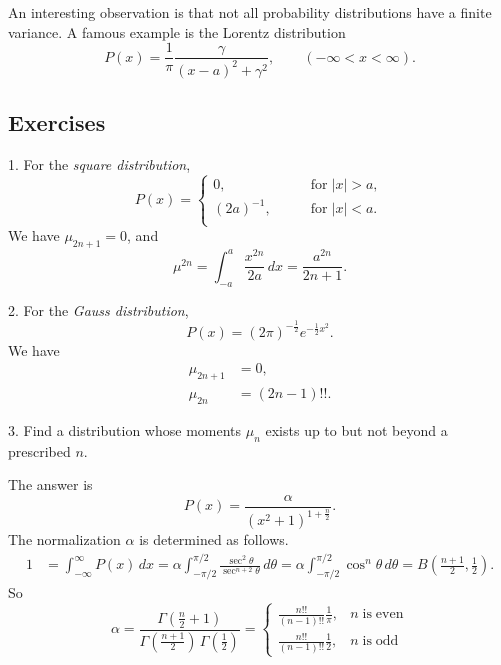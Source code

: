 \documentclass{book}
\numberwithin{equation}{section}
\theoremstyle{plain}
\theoremstyle{definition}
\theoremstyle{remark}
\begin{document}
An interesting observation is that
not all probability distributions have a finite variance.
%
A famous example is the Lorentz distribution
\begin{equation}
P(x) = \frac{1}{\pi} \frac{\gamma}{ (x-a)^2 + \gamma^2 },
\qquad (-\infty < x < \infty).
\end{equation}

\subsection*{Exercises}

1. For the \emph{square distribution},
\begin{equation}
P(x) =
\begin{cases}
  0,          \qquad &\mathrm{for\;} |x| > a, \\
  (2a)^{-1},  \qquad &\mathrm{for\;} |x| < a. \\
\end{cases}
\end{equation}
We have $\mu_{2n+1} = 0$, and
$$
\mu^{2n}
=
\int_{-a}^a \frac{x^{2n}}{2a} \, dx
=
\frac{ a^{2n} }{ 2n + 1 }.
$$


2. For the \emph{Gauss distribution},
\begin{equation}
  P(x) = (2 \pi)^{-\frac 1 2} e^{-\frac{1}{2} x^2}.
\end{equation}
We have
$$
\begin{aligned}
  \mu_{2n+1} &= 0, \\
  \mu_{2n}  &= (2n-1)!!.
\end{aligned}
$$

3. Find a distribution whose moments $\mu_n$ exists up to but not beyond a prescribed $n$.

The answer is
$$
P(x) = \frac{ \alpha } { (x^2 + 1)^{1 + \frac{n}{2} } }.
$$
The normalization $\alpha$ is determined as follows.
$$
\begin{aligned}
1 &= \int_{-\infty}^\infty P(x) \, dx
  = \alpha \int_{-\pi/2}^{\pi/2} \frac{ \sec^2\theta } { \sec^{n+2}\theta } \, d\theta
  =\alpha \int_{-\pi/2}^{\pi/2} \cos^n\theta \, d\theta
  = B\left(\frac{n+1}{2}, \frac{1}{2}\right).
\end{aligned}
$$
So
$$
\alpha = \frac{ \Gamma(\frac n  2 + 1) } { \Gamma(\frac{n+1}{2}) \, \Gamma(\frac 1 2) }
=
\begin{cases}
  \frac{n!!}{(n-1)!! }\frac{1}{\pi}, & n \mathrm{\; is \; even} \\
  \frac{n!!}{(n-1)!! }\frac{1}{2}, & n \mathrm{\; is \; odd}
\end{cases}
$$
\end{document}
